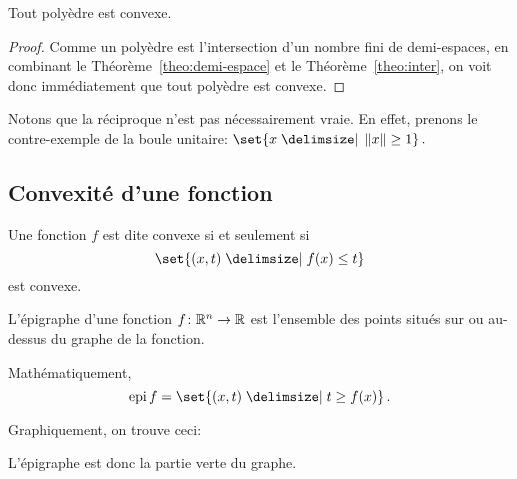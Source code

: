	\begin{mytheo}\leavevmode
		Tout polyèdre est convexe.
		\begin{proof}
			Comme un polyèdre est l'intersection
			d'un nombre fini de demi-espaces,
			en combinant le Théorème~\ref{theo:demi-espace}
			et le Théorème~\ref{theo:inter},
			on voit donc immédiatement
			que tout polyèdre est convexe.
		\end{proof}

		\begin{myrem}
			Notons que la réciproque n'est pas nécessairement vraie.
			En effet,
			prenons le contre-exemple de la boule unitaire:
			$\set{x \given \norm{x} \ge 1}\,.$
		\end{myrem}
	\end{mytheo}

\subsection{Convexité d'une fonction}

	\begin{mydef}\leavevmode
		Une fonction $f$ est dite convexe si et seulement si
		\[
		\set{(x,t) \given f(x) \le t}
		\]
		est convexe.
	\end{mydef}

	\begin{mydef}\leavevmode
		L'épigraphe d'une fonction $f \colon \mathbb{R}^n \to \mathbb{R}$
		est l'ensemble des points situés sur ou au-dessus
		du graphe de la fonction.

		Mathématiquement,
		\[
		\epi f = \set{(x,t) \given t \ge f(x)}\,.
		\]

		Graphiquement, on trouve ceci:

		\begin{center}
		\end{center}

		L'épigraphe est donc la partie verte du graphe.
	\end{mydef}

